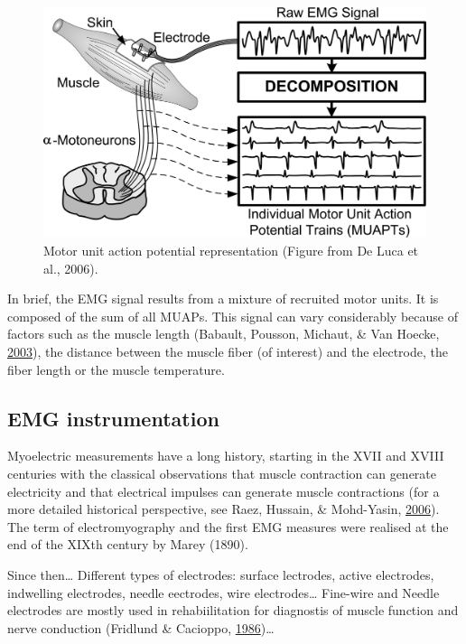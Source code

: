 \documentclass[a4paper,12pt,twoside,openright,oldfontcommands]{memoir}
\begin{document}
\begin{figure}[H]

{\centering \includegraphics[width=0.75\linewidth]{assets/muap} 

}

\caption{Motor unit action potential representation (Figure from De Luca et al., 2006).}\label{fig:muap}
\end{figure}

In brief, the EMG signal results from a mixture of recruited motor
units. It is composed of the sum of all MUAPs. This signal can vary
considerably because of factors such as the muscle length (Babault,
Pousson, Michaut, \& Van Hoecke,
\protect\hyperlink{ref-babault_effect_2003}{2003}), the distance between
the muscle fiber (of interest) and the electrode, the fiber length or
the muscle temperature.

\subsection{EMG instrumentation}\label{emg-instrumentation}

Myoelectric measurements have a long history, starting in the XVII and
XVIII centuries with the classical observations that muscle contraction
can generate electricity and that electrical impulses can generate
muscle contractions (for a more detailed historical perspective, see
Raez, Hussain, \& Mohd-Yasin,
\protect\hyperlink{ref-raez_techniques_2006}{2006}). The term of
electromyography and the first EMG measures were realised at the end of
the XIXth century by Marey (1890).

Since then\ldots{} Different types of electrodes: surface lectrodes,
active electrodes, indwelling electrodes, needle eectrodes, wire
electrodes\ldots{} Fine-wire and Needle electrodes are mostly used in
rehabiilitation for diagnostis of muscle function and nerve conduction
(Fridlund \& Cacioppo,
\protect\hyperlink{ref-fridlund_guidelines_1986}{1986})\ldots{}
\end{document}
